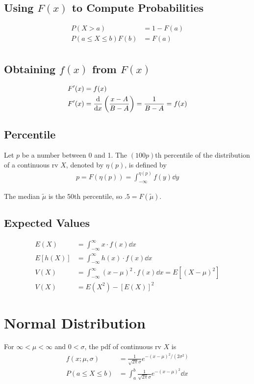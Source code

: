 \documentclass[paper=A4, pagesize, fontsize=7pt, DIV=calc]{scrartcl}
\begin{document}
\begin{minipage}[t]{.45\linewidth}
  \subsection{Using $F(x)$ to Compute Probabilities}
  \begin{align*}
    P(X > a) &= 1 - F(a) \\
    P(a \le X \le b) F(b) &= F(a) \\
  \end{align*}

  \subsection{Obtaining $f(x)$ from $F(x)$}
  \begin{align*}
    F^{\prime}(x) &= f(x) \\
    F^{\prime}(x) &= \dv{x}\left(\frac{x - A}{B - A}\right) = \frac{1}{B - A} = f(x)
  \end{align*}

  \subsection{Percentile}
  Let $p$ be a number between 0 and 1. The $(100p)$th percentile of the distribution of a continuous rv $X$, denoted by $\eta(p)$, is defined by
  \begin{align*}
    p = F(\eta(p)) = \int_{-\infty}^{\eta(p)} f(y) \dd{y}
  \end{align*}

  The median $\tilde{\mu}$ is the 50th percentile, so $.5 = F(\tilde{\mu})$.

  \subsection{Expected Values}
  \begin{align*}
    E(X) &= \int_{-\infty}^{\infty} x \cdot f(x) \dd{x} \\
    E[h(X)] &= \int_{-\infty}^{\infty} h(x) \cdot f(x) \dd{x} \\
    V(X) &= \int_{-\infty}^{\infty} (x - \mu)^2 \cdot f(x) \dd{x} = E[(X - \mu)^2] \\
    V(X) &= E(X^2) - [E(X)]^2
  \end{align*}

  \section{Normal Distribution}
  For $\infty < \mu < \infty$ and $0 < \sigma$, the pdf of continuous rv $X$ is
  \begin{align*}
    f(x; \mu, \sigma) &= \frac{1}{\sqrt{2\pi}\sigma} e^{-(x - \mu)^2 / (2\sigma^2)} \\
    P(a \le X \le b) &= \int_{a}^{b} \frac{1}{\sqrt{2\pi}\sigma} e^{-(x - \mu)^2} \dd{x}
  \end{align*}


\end{minipage}
\end{document}
